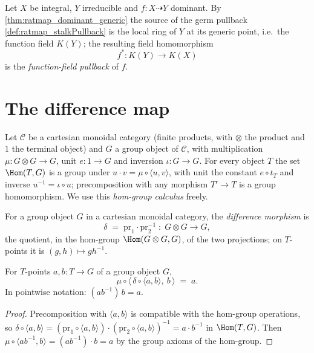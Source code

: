 \begin{definition}
  \label{def:ratmap_functionFieldPullback}
  \leanok
  Let \(X\) be integral, \(Y\) irreducible and \(f : X \dashrightarrow Y\)
  dominant. By \ref{thm:ratmap_dominant_generic} the source of the germ pullback
  \ref{def:ratmap_stalkPullback} is the local ring of \(Y\) at its generic
  point, i.e.\ the function field \(K(Y)\); the resulting field homomorphism
  \[
    f^* : K(Y) \longrightarrow K(X)
  \]
  is the \emph{function-field pullback} of \(f\).
\end{definition}

\section{The difference map}
\label{sec:difference_map}

Let \(\mathcal C\) be a cartesian monoidal category (finite products, with
\(\otimes\) the product and \(1\) the terminal object) and \(G\) a group object
of \(\mathcal C\), with multiplication \(\mu : G \otimes G \to G\), unit
\(e : 1 \to G\) and inversion \(\iota : G \to G\). For every object \(T\) the
set \(\Hom(T, G)\) is a group under \(u \cdot v = \mu \circ \langle u,
v\rangle\), with unit the constant \(e \circ t_T\) and inverse
\(u^{-1} = \iota \circ u\); precomposition with any morphism \(T' \to T\) is a
group homomorphism. We use this \emph{hom-group calculus} freely.

\begin{definition}
  \label{def:grp_diff}
  \leanok
  For a group object \(G\) in a cartesian monoidal category, the
  \emph{difference morphism} is
  \[
    \delta \;=\; \mathrm{pr}_1 \cdot \mathrm{pr}_2^{-1}
    \;:\; G \otimes G \longrightarrow G,
  \]
  the quotient, in the hom-group \(\Hom(G \otimes G, G)\), of the two
  projections; on \(T\)-points it is \((g, h) \mapsto g h^{-1}\).
\end{definition}

\begin{lemma}
  \label{lem:grp_diff_reconstruct}
  \leanok
  For \(T\)-points \(a, b : T \to G\) of a group object \(G\),
  \[
    \mu \circ \bigl\langle\, \delta \circ \langle a, b\rangle,\ b \,\bigr\rangle
    \;=\; a .
  \]
  In pointwise notation: \((a b^{-1})\, b = a\).
\end{lemma}
\begin{proof}
  \leanok
  Precomposition with \(\langle a, b\rangle\) is compatible with the hom-group
  operations, so
  \(\delta \circ \langle a, b\rangle
  = (\mathrm{pr}_1 \circ \langle a,b\rangle)\cdot(\mathrm{pr}_2 \circ
  \langle a,b\rangle)^{-1} = a \cdot b^{-1}\) in \(\Hom(T, G)\). Then
  \(\mu \circ \langle a b^{-1}, b\rangle = (a b^{-1}) \cdot b = a\) by the group
  axioms of the hom-group.
\end{proof}

